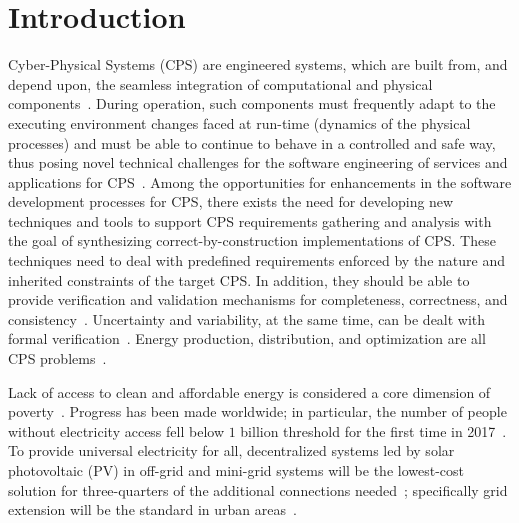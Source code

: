 \documentclass[runningheads]{llncs}
\begin{document}
\section{Introduction}

Cyber-Physical Systems  (CPS) are engineered systems, which are built from, and depend upon, 
the seamless integration of computational  and  physical  components~\cite{NSF2015}. 
During operation, such components must frequently adapt to the executing environment changes 
faced at run-time (dynamics of the physical processes) and must be able to continue to behave 
in a controlled and safe way, thus posing novel technical challenges for the software engineering of services and applications for CPS~\cite{Metzger2014}. %
%
Among the opportunities for enhancements in the software development processes for CPS, there exists the need for developing new techniques and tools to support CPS requirements gathering and analysis with the goal of synthesizing correct-by-construction implementations of CPS. These techniques need to deal with predefined requirements enforced by the nature and inherited constraints of the target CPS. In addition, they should be able to provide verification and validation mechanisms for completeness, correctness, and consistency~\cite{Al-Jaroodi2016}. Uncertainty and variability, at the same time, can be dealt with formal verification~\cite{NESSI}. Energy production, distribution, and optimization are all CPS problems~\cite{UC}. 

Lack of access to clean and affordable energy is considered a core dimension of poverty~\cite{Hussein2012}. Progress has been made worldwide; in particular, the number of people without electricity access fell below $1$ billion threshold for the first time in 2017~\cite{IEAweo2018}. To provide universal electricity for all, decentralized systems led by solar photovoltaic (PV) in off-grid and mini-grid systems will be the lowest-cost solution for three-quarters of the additional connections needed~\cite{Hussein2012}; specifically grid extension will be the standard in urban areas~\cite{IEAweo2018}.
\end{document}
